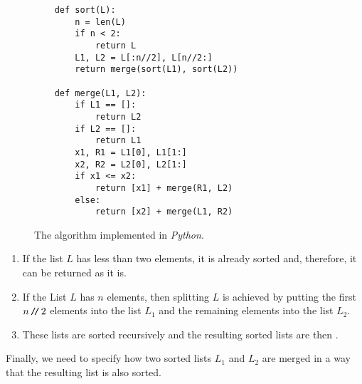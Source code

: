 \begin{figure}[!ht]
  \centering
\begin{verbatim}
    def sort(L):
        n = len(L)
        if n < 2:
            return L
        L1, L2 = L[:n//2], L[n//2:]
        return merge(sort(L1), sort(L2))
    
    def merge(L1, L2):
        if L1 == []:
            return L2
        if L2 == []:
            return L1
        x1, R1 = L1[0], L1[1:]
        x2, R2 = L2[0], L2[1:]
        if x1 <= x2:
            return [x1] + merge(R1, L2)
        else:
            return [x2] + merge(L1, R2)
\end{verbatim}
\vspace*{-0.3cm}
  \caption{The  algorithm implemented in \textsl{Python}.}
  \label{fig:merge-sort.stlx}
\end{figure}
\begin{enumerate}
\item If the list $L$ has less than two elements, it is already sorted and, therefore, it
      can be returned as it is.
\item If the List $L$ has $n$ elements, then splitting $L$ is achieved by putting the first $n\mbox{\,\texttt{/}$\!$\texttt{/}\,} 2$
      elements into the list $L_1$ and the remaining elements into the list $L_2$.
\item These lists are sorted recursively and the resulting sorted lists are then .
\end{enumerate}
Finally, we need to specify how two sorted lists $L_1$ and $L_2$ are merged in a way that the resulting list
is also sorted.
